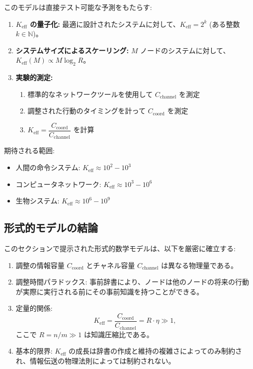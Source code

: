 \documentclass[11pt,a4paper]{article}
\begin{document}
	このモデルは直接テスト可能な予測をもたらす:
	\begin{enumerate}
		\item \textbf{$K_{\mathrm{eff}}$ の量子化:} 最適に設計されたシステムに対して、$K_{\mathrm{eff}} = 2^k$ (ある整数 $k \in \mathbb{N}$)。
		
		\item \textbf{システムサイズによるスケーリング:} $M$ ノードのシステムに対して、$K_{\mathrm{eff}}(M) \propto M \log_2 R$。
		
		\item \textbf{実験的測定:} 
		\begin{enumerate}
			\item 標準的なネットワークツールを使用して $C_{\text{channel}}$ を測定
			\item 調整された行動のタイミングを計って $C_{\text{coord}}$ を測定
			\item $K_{\mathrm{eff}} = \dfrac{C_{\text{coord}}}{C_{\text{channel}}}$ を計算
		\end{enumerate}
	\end{enumerate}
	
	期待される範囲:
	\begin{itemize}
		\item 人間の命令システム: $K_{\mathrm{eff}} \approx 10^2 - 10^3$
		\item コンピュータネットワーク: $K_{\mathrm{eff}} \approx 10^3 - 10^6$
		\item 生物システム: $K_{\mathrm{eff}} \approx 10^6 - 10^9$
	\end{itemize}
	
	\subsection{形式的モデルの結論}
	
	このセクションで提示された形式的数学モデルは、以下を厳密に確立する:
	\begin{enumerate}
		\item 調整の情報容量 $C_{\text{coord}}$ とチャネル容量 $C_{\text{channel}}$ は異なる物理量である。
		\item 調整時間パラドックス: 事前辞書により、ノードは他のノードの将来の行動が実際に実行される前にその事前知識を持つことができる。
		\item 定量的関係:
		\[
		K_{\mathrm{eff}} = \frac{C_{\text{coord}}}{C_{\text{channel}}} = R \cdot \eta \gg 1,
		\]
		ここで $R = n/m \gg 1$ は知識圧縮比である。
		\item 基本的限界: $K_{\mathrm{eff}}$ の成長は辞書の作成と維持の複雑さによってのみ制約され、情報伝送の物理法則によっては制約されない。
	\end{enumerate}
	
\end{document}
